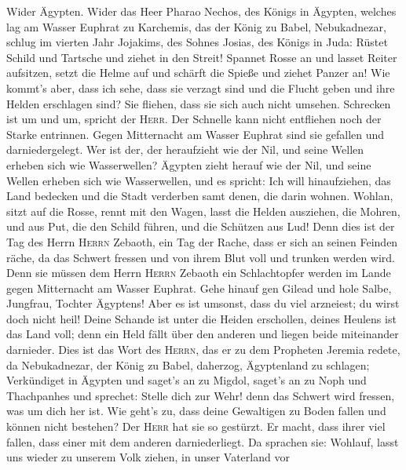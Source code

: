  Wider Ägypten. Wider das Heer Pharao Nechos, des Königs
in Ägypten, welches lag am Wasser Euphrat zu Karchemis, das der König zu
Babel, Nebukadnezar, schlug im vierten Jahr Jojakims, des Sohnes Josias,
des Königs in Juda:  Rüstet Schild und Tartsche und ziehet
in den Streit!  Spannet Rosse an und lasset Reiter
aufsitzen, setzt die Helme auf und schärft die Spieße und ziehet Panzer
an!  Wie kommt's aber, dass ich sehe, dass sie verzagt
sind und die Flucht geben und ihre Helden erschlagen sind? Sie fliehen,
dass sie sich auch nicht umsehen. Schrecken ist um und um, spricht der
\textsc{Herr}.  Der Schnelle kann nicht entfliehen noch
der Starke entrinnen. Gegen Mitternacht am Wasser Euphrat sind sie
gefallen und darniedergelegt.  Wer ist der, der
heraufzieht wie der Nil, und seine Wellen erheben sich wie Wasserwellen?
 Ägypten zieht herauf wie der Nil, und seine Wellen
erheben sich wie Wasserwellen, und es spricht: Ich will hinaufziehen,
das Land bedecken und die Stadt verderben samt denen, die darin wohnen.
 Wohlan, sitzt auf die Rosse, rennt mit den Wagen, lasst
die Helden ausziehen, die Mohren, und aus Put, die den Schild führen,
und die Schützen aus Lud!  Denn dies ist der Tag des
Herrn \textsc{Herrn} Zebaoth, ein Tag der Rache, dass er sich an seinen
Feinden räche, da das Schwert fressen und von ihrem Blut voll und
trunken werden wird. Denn sie müssen dem Herrn \textsc{Herrn} Zebaoth
ein Schlachtopfer werden im Lande gegen Mitternacht am Wasser Euphrat.
 Gehe hinauf gen Gilead und hole Salbe, Jungfrau, Tochter
Ägyptens! Aber es ist umsonst, dass du viel arzneiest; du wirst doch
nicht heil!  Deine Schande ist unter die Heiden
erschollen, deines Heulens ist das Land voll; denn ein Held fällt über
den anderen und liegen beide miteinander darnieder.  Dies
ist das Wort des \textsc{Herrn}, das er zu dem Propheten Jeremia redete,
da Nebukadnezar, der König zu Babel, daherzog, Ägyptenland zu schlagen;
 Verkündiget in Ägypten und saget's an zu Migdol, saget's
an zu Noph und Thachpanhes und sprechet: Stelle dich zur Wehr! denn das
Schwert wird fressen, was um dich her ist.  Wie geht's
zu, dass deine Gewaltigen zu Boden fallen und können nicht bestehen? Der
\textsc{Herr} hat sie so gestürzt.  Er macht, dass ihrer
viel fallen, dass einer mit dem anderen darniederliegt. Da sprachen sie:
Wohlauf, lasst uns wieder zu unserem Volk ziehen, in unser Vaterland vor
